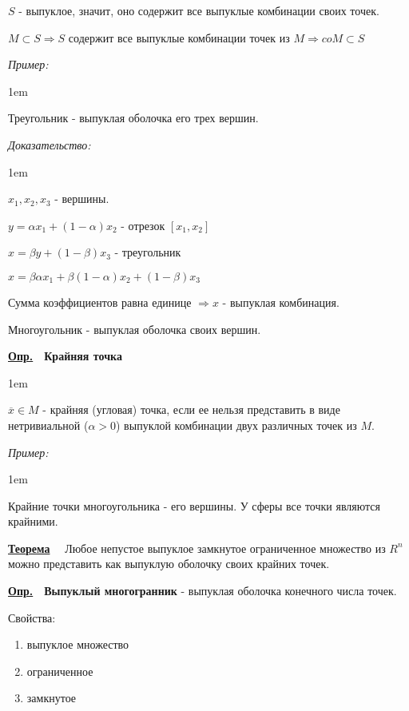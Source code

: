 \documentclass[11pt]{article}
\newenvironment{inlinedf}[1]{
  \underline{\textbf{Опр.}}\ \ \textbf{#1} - }{
}
\newenvironment{df}[1]{
  \underline{\textbf{Опр.}}\ \ \textbf{#1}
  
  \begin{adjustwidth}{1em}{}
}{
  \end{adjustwidth}
}
\newenvironment{proof}{
  \textit{Доказательство:}
    
  \begin{adjustwidth}{1em}{}
}{
  \end{adjustwidth}
}
\newenvironment{theorem}{
  \underline{\textbf{Теорема}}\ \ }{
  
}
\newenvironment{example}{
  \textit{Пример:}
    
  \begin{adjustwidth}{1em}{}
}{
  \end{adjustwidth}
}
\begin{document}
\begin{sloppypar}
\begin{enumerate}
    $S$ - выпуклое, значит, оно содержит все выпуклые комбинации своих точек.
    
    $M \subset S \Rightarrow S$ содержит все выпуклые комбинации точек из $M \Rightarrow coM \subset S$
\end{enumerate}

\begin{example}
  Треугольник - выпуклая оболочка его трех вершин.
  
  \begin{proof}
    $x_1, x_2, x_3$ - вершины.
    
    $y = \alpha x_1 + (1 - \alpha)x_2$ - отрезок $[x_1, x_2]$
    
    $x = \beta y + (1 - \beta)x_3$ - треугольник
    
    $x = \beta \alpha x_1 + \beta(1 - \alpha)x_2 + (1 - \beta)x_3$
    
    Сумма коэффициентов равна единице $\Rightarrow x$ - выпуклая комбинация.
  \end{proof}
  
  Многоугольник - выпуклая оболочка своих вершин.
\end{example}

\begin{df}{Крайняя точка}
  $\overline{x} \in M$ - крайняя (угловая) точка, если ее нельзя представить в виде нетривиальной ($\alpha > 0$) выпуклой комбинации двух различных точек из $M$.
\end{df}

\begin{example}
  Крайние точки многоугольника - его вершины. У сферы все точки являются крайними.
\end{example}

\begin{theorem}
  Любое непустое выпуклое замкнутое ограниченное множество из $R^n$ можно представить как выпуклую оболочку своих крайних точек.
\end{theorem}

\begin{inlinedf}{Выпуклый многогранник}
  выпуклая оболочка конечного числа точек.
\end{inlinedf}

Свойства:
\begin{enumerate}
  \item выпуклое множество
  \item ограниченное
  \item замкнутое
  

\end{enumerate}
\end{sloppypar}
\end{document}
